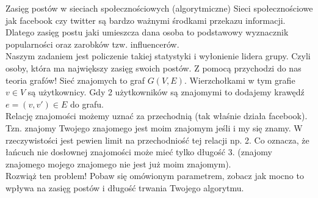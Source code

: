 \begin{exercise}{Zasięg postów w sieciach społecznościowych (algorytmiczne)}{}
Sieci społecznościowe jak facebook czy twitter są bardzo ważnymi środkami przekazu informacji. Dlatego zasięg postu jaki umieszcza dana osoba to podstawowy wyznacznik popularności oraz zarobków tzw. influencerów. \\

Naszym zadaniem jest policzenie takiej statystyki i wyłonienie lidera grupy. Czyli osoby, która ma największy zasięg swoich postów. Z pomocą przychodzi do nas teoria grafów! Sieć znajomych to graf $G(V, E)$. Wierzchołkami w tym grafie $v \in V$ są użytkownicy. Gdy 2 użytkowników są znajomymi to dodajemy krawędź $e=(v,v') \in E$ do grafu. \\
Relację znajomości możemy uznać za przechodnią (tak właśnie działa facebook). Tzn. znajomy Twojego znajomego jest moim znajomym jeśli i my się znamy. W rzeczywistości jest pewien limit na przechodniość tej relacji np. 2. Co oznacza, że łańcuch nie dosłownej znajomości może mieć tylko długość 3. (znajomy znajomego mojego znajomego nie jest już moim znajomym). \\

Rozwiąż ten problem! Pobaw się omówionym parametrem, zobacz jak mocno to wpływa na zasięg postów i długość trwania Twojego algorytmu.
\end{exercise}

